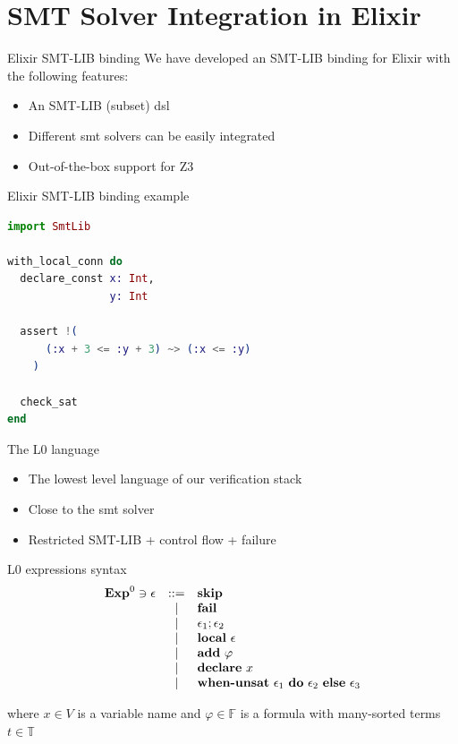 \documentclass{beamer}
\begin{document}
  \section{SMT Solver Integration in Elixir}
  \begin{frame}{Elixir SMT-LIB binding}
    We have developed an SMT-LIB binding for Elixir with the following features:

    \begin{itemize}
      \item \pause An SMT-LIB (subset) \gls*{dsl}
      \item \pause Different \acrshort*{smt} solvers can be easily integrated
      \item \pause Out-of-the-box support for Z3
    \end{itemize}
  \end{frame}
  \begin{frame}[fragile]{Elixir SMT-LIB binding example}
    \small
    \begin{lstlisting}[language=elixir,numbers=none,frame=none]
import SmtLib

with_local_conn do
  declare_const x: Int,
                y: Int

  assert !(
      (:x + 3 <= :y + 3) ~> (:x <= :y)
    )

  check_sat
end
      \end{lstlisting}
  \end{frame}
  \begin{frame}{The L0 language}
    \begin{itemize}
      \item \pause The lowest level language of our verification stack
      \item \pause Close to the \acrshort*{smt} solver
      \item \pause Restricted SMT-LIB + control flow + failure
    \end{itemize}
  \end{frame}
  \begin{frame}{L0 expressions syntax}
    \[
      \begin{array}{rcll}
        \mathbf{Exp}^{0} \ni \epsilon & ::= & \textbf{skip} \\
        & | & \textbf{fail} \\
        & | & \epsilon_1;\epsilon_2 \\
        & | & \textbf{local}~\epsilon \\
        & | & \textbf{add}~\varphi \\
        & | & \textbf{declare}~x \\
        & | & \textbf{when-unsat}~\epsilon_1~\textbf{do}~\epsilon_2~\textbf{else}~\epsilon_3 \\
      \end{array}
    \]

    \pause where $x \in V$ is a variable name and $\varphi \in \mathbb{F}$ is a 
    formula with many-sorted terms $t \in \mathbb{T}$
  \end{frame}
\end{document}
